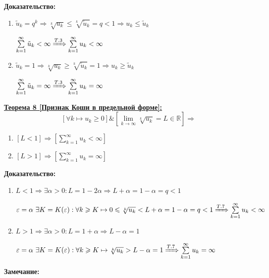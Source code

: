 \documentclass[a4paper,12pt]{article} %
\newcommand{\R}{\mathbb{R}}
\newcommand{\series}{\sum\limits_{k=1}^{\infty}}
\newcommand{\useriesl}{\sum\limits_{k=1}^{\infty} u_k < \infty}
\newcommand{\useriese}{\sum\limits_{k=1}^{\infty} u_k = \infty}
\begin{document}
\textbf{Доказательство:}
\begin{enumerate}
	\item $\tilde{u}_k = q^k \Rightarrow \sqrt[k]{u_k} \leqslant \sqrt[k]{\tilde{u}_k} = q < 1 \Rightarrow u_k \leqslant \tilde{u}_k$
	
	$\series \tilde{u}_k < \infty \xRightarrow[]{T.3} \useriesl$
	\item $\tilde{u}_k = 1 \Rightarrow \sqrt[k]{u_k} \geqslant \sqrt[k]{\tilde{u}_k} = 1 \Rightarrow u_k \geqslant \tilde{u}_k$
	
	$\series \tilde{u}_k = \infty \xRightarrow[]{T.3} \useriese$
\end{enumerate}
\underline{\textbf{Теорема 8 [Признак Коши в предельной форме]:}}
$$\left[ \forall k \mapsto u_k \geqslant 0 \right] \& \left[ \lim\limits_{k \to \infty} \sqrt[k]{u_k} = L \in \R \right] \Rightarrow$$
\begin{enumerate}
	\item $\left[ L < 1 \right] \Rightarrow \left[ \useriesl \right]$
	\item $\left[ L > 1 \right] \Rightarrow \left[ \useriese \right]$
\end{enumerate}
\textbf{Доказательство:}
\begin{enumerate}
	\item $L < 1 \Rightarrow \exists \alpha > 0: L = 1 - 2\alpha \Rightarrow L + \alpha = 1 - \alpha = q < 1$
	
	$\varepsilon = \alpha \ \exists K = K(\varepsilon): \forall k \geqslant K \mapsto 0 \leqslant \sqrt[k]{u_k} < L + \alpha = 1 - \alpha = q < 1 \xRightarrow[]{T.7} \useriesl$
	\item $L > 1 \Rightarrow \exists \alpha > 0: L = 1 + \alpha \Rightarrow L - \alpha = 1$
	
	$\varepsilon = \alpha \ \exists K = K(\varepsilon): \forall k \geqslant K \mapsto \sqrt[k]{u_k} > L - \alpha = 1 \xRightarrow[]{T.7} \useriese$
\end{enumerate}
\textbf{Замечание:}
\end{document}
